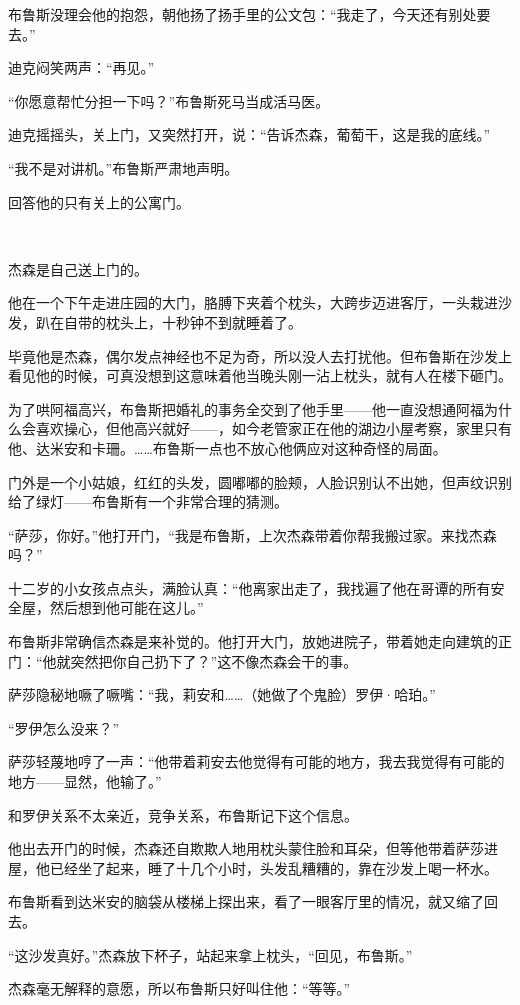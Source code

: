 \documentclass[../main]{subfiles}
\begin{document}
布鲁斯没理会他的抱怨，朝他扬了扬手里的公文包：“我走了，今天还有别处要去。”

迪克闷笑两声：“再见。”

“你愿意帮忙分担一下吗？”布鲁斯死马当成活马医。

迪克摇摇头，关上门，又突然打开，说：“告诉杰森，葡萄干，这是我的底线。”

“我不是对讲机。”布鲁斯严肃地声明。

回答他的只有关上的公寓门。

~\

杰森是自己送上门的。

他在一个下午走进庄园的大门，胳膊下夹着个枕头，大跨步迈进客厅，一头栽进沙发，趴在自带的枕头上，十秒钟不到就睡着了。

毕竟他是杰森，偶尔发点神经也不足为奇，所以没人去打扰他。但布鲁斯在沙发上看见他的时候，可真没想到这意味着他当晚头刚一沾上枕头，就有人在楼下砸门。

为了哄阿福高兴，布鲁斯把婚礼的事务全交到了他手里——他一直没想通阿福为什么会喜欢操心，但他高兴就好——，如今老管家正在他的湖边小屋考察，家里只有他、达米安和卡珊。……布鲁斯一点也不放心他俩应对这种奇怪的局面。

门外是一个小姑娘，红红的头发，圆嘟嘟的脸颊，人脸识别认不出她，但声纹识别给了绿灯——布鲁斯有一个非常合理的猜测。

“萨莎，你好。”他打开门，“我是布鲁斯，上次杰森带着你帮我搬过家。来找杰森吗？”

十二岁的小女孩点点头，满脸认真：“他离家出走了，我找遍了他在哥谭的所有安全屋，然后想到他可能在这儿。”

布鲁斯非常确信杰森是来补觉的。他打开大门，放她进院子，带着她走向建筑的正门：“他就突然把你自己扔下了？”这不像杰森会干的事。

萨莎隐秘地噘了噘嘴：“我，莉安和……（她做了个鬼脸）罗伊·哈珀。”

“罗伊怎么没来？”

萨莎轻蔑地哼了一声：“他带着莉安去他觉得有可能的地方，我去我觉得有可能的地方——显然，他输了。”

和罗伊关系不太亲近，竞争关系，布鲁斯记下这个信息。

他出去开门的时候，杰森还自欺欺人地用枕头蒙住脸和耳朵，但等他带着萨莎进屋，他已经坐了起来，睡了十几个小时，头发乱糟糟的，靠在沙发上喝一杯水。

布鲁斯看到达米安的脑袋从楼梯上探出来，看了一眼客厅里的情况，就又缩了回去。

“这沙发真好。”杰森放下杯子，站起来拿上枕头，“回见，布鲁斯。”

杰森毫无解释的意愿，所以布鲁斯只好叫住他：“等等。”
\end{document}
